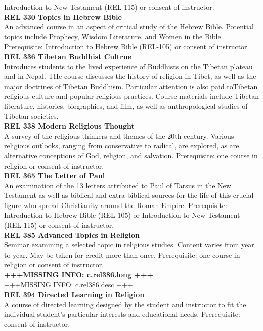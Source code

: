 \documentclass[
  letterpaper,
]{scrbook}
\begin{document}
Introduction to New Testament (REL-115) or consent of instructor.\\
\textbf{REL 330 Topics in Hebrew Bible}\\
An advanced course in an aspect of critical study of the Hebrew Bible.
Potential topics include Prophecy, Wisdom Literature, and Women in the
Bible. Prerequisite: Introduction to Hebrew Bible (REL-105) or consent
of instructor.\\
\textbf{REL 336 Tibetan Buddhist Cultrue}\\
Introduces students to the lived experience of Buddhists on the Tibetan
plateau and in Nepal. THe course discusses the history of religion in
Tibet, as well as the major doctrines of Tibetan Buddhism. Particular
attention is also paid toTibetan religious culture and popular religious
practices. Course materials include Tibetan literature, histories,
biographies, and film, as well as anthropological studies of Tibetan
societies.\\
\textbf{REL 338 Modern Religious Thought}\\
A survey of the religious thinkers and themes of the 20th century.
Various religious outlooks, ranging from conservative to radical, are
explored, as are alternative conceptions of God, religion, and
salvation. Prerequisite: one course in religion or consent of
instructor.\\
\textbf{REL 365 The Letter of Paul}\\
An examination of the 13 letters attributed to Paul of Tarsus in the New
Testament as well as biblical and extra-biblical sources for the life of
this crucial figure who spread Christianity around the Roman Empire.
Prerequisite: Introduction to Hebrew Bible (REL-105) or Introduction to
New Testament (REL-115) or consent of instructor.\\
\textbf{REL 385 Advanced Topics in Religion}\\
Seminar examining a selected topic in religious studies. Content varies
from year to year. May be taken for credit more than once. Prerequisite:
one course in religion or consent of instructor.\\
\textbf{+++MISSING INFO: c.rel386.long +++}\\
+++MISSING INFO: c.rel386.desc +++\\
\textbf{REL 394 Directed Learning in Religion}\\
A course of directed learning designed by the student and instructor to
fit the individual student's particular interests and educational needs.
Prerequisite: consent of instructor.\\
\end{document}

